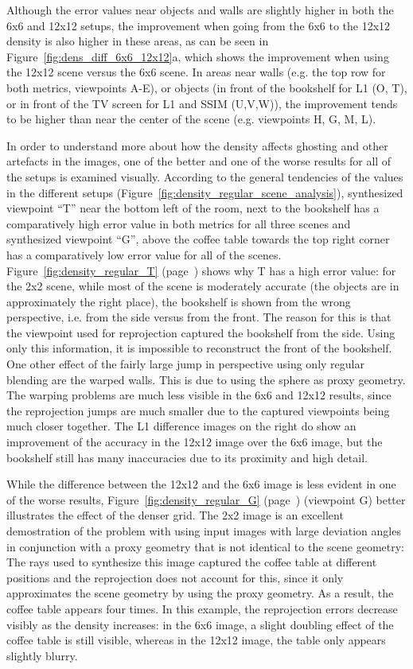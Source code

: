 Although the error values near objects and walls are slightly higher in both the 6x6 and 12x12 setups, the improvement when going from the 6x6 to the 12x12 density is also higher in these areas, as can be seen in Figure~\ref{fig:dens_diff_6x6_12x12}a, which shows the improvement when using the 12x12 scene versus the 6x6 scene. In areas near walls (e.g. the top row for both metrics, viewpoints A-E), or objects (in front of the bookshelf for L1 (O, T), or in front of the TV screen for L1 and SSIM (U,V,W)), the improvement tends to be higher than near the center of the scene (e.g. viewpoints H, G, M, L).

In order to understand more about how the density affects ghosting and other artefacts in the images, one of the better and one of the worse results for all of the setups is examined visually. According to the general tendencies of the values in the different setups (Figure~\ref{fig:density_regular_scene_analysis}), synthesized viewpoint ``T'' near the bottom left of the room, next to the bookshelf has a comparatively high error value in both metrics for all three scenes and synthesized viewpoint ``G'', above the coffee table towards the top right corner has a comparatively low error value for all of the scenes.
Figure~\ref{fig:density_regular_T} (page~\pageref{fig:density_regular_T}) shows why T has a high error value: for the 2x2 scene, while most of the scene is moderately accurate (the objects are in approximately the right place), the bookshelf is shown from the wrong perspective, i.e. from the side versus from the front. The reason for this is that the viewpoint used for reprojection captured the bookshelf from the side. Using only this information, it is impossible to reconstruct the front of the bookshelf. One other effect of the fairly large jump in perspective using only regular blending are the warped walls. This is due to using the sphere as proxy geometry. The warping problems are much less visible in the 6x6 and 12x12 results, since the reprojection jumps are much smaller due to the captured viewpoints being much closer together. The L1 difference images on the right do show an improvement of the accuracy in the 12x12 image over the 6x6 image, but the bookshelf still has many inaccuracies due to its proximity and high detail.

While the difference between the 12x12 and the 6x6 image is less evident in one of the worse results, Figure~\ref{fig:density_regular_G} (page~\pageref{fig:density_regular_G}) (viewpoint G) better illustrates the effect of the denser grid. The 2x2 image is an excellent demostration of the problem with using input images with large deviation angles in conjunction with a proxy geometry that is not identical to the scene geometry: The rays used to synthesize this image captured the coffee table at different positions and the reprojection does not account for this, since it only approximates the scene geometry by using the proxy geometry. As a result, the coffee table appears four times. In this example, the reprojection errors decrease visibly as the density increases: in the 6x6 image, a slight doubling effect of the coffee table is still visible, whereas in the 12x12 image, the table only appears slightly blurry.


